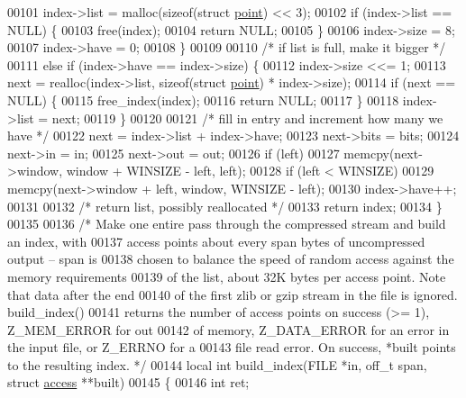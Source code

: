 \begin{DoxyCode}
00101         index->list = malloc(\textcolor{keyword}{sizeof}(\textcolor{keyword}{struct} \hyperlink{structpoint}{point}) << 3);
00102         \textcolor{keywordflow}{if} (index->list == NULL) \{
00103             free(index);
00104             \textcolor{keywordflow}{return} NULL;
00105         \}
00106         index->size = 8;
00107         index->have = 0;
00108     \}
00109 
00110     \textcolor{comment}{/* if list is full, make it bigger */}
00111     \textcolor{keywordflow}{else} \textcolor{keywordflow}{if} (index->have == index->size) \{
00112         index->size <<= 1;
00113         next = realloc(index->list, \textcolor{keyword}{sizeof}(\textcolor{keyword}{struct} \hyperlink{structpoint}{point}) * index->size);
00114         \textcolor{keywordflow}{if} (next == NULL) \{
00115             free\_index(index);
00116             \textcolor{keywordflow}{return} NULL;
00117         \}
00118         index->list = next;
00119     \}
00120 
00121     \textcolor{comment}{/* fill in entry and increment how many we have */}
00122     next = index->list + index->have;
00123     next->bits = bits;
00124     next->in = in;
00125     next->out = out;
00126     \textcolor{keywordflow}{if} (left)
00127         memcpy(next->window, window + WINSIZE - left, left);
00128     \textcolor{keywordflow}{if} (left < WINSIZE)
00129         memcpy(next->window + left, window, WINSIZE - left);
00130     index->have++;
00131 
00132     \textcolor{comment}{/* return list, possibly reallocated */}
00133     \textcolor{keywordflow}{return} index;
00134 \}
00135 
00136 \textcolor{comment}{/* Make one entire pass through the compressed stream and build an index, with}
00137 \textcolor{comment}{   access points about every span bytes of uncompressed output -- span is}
00138 \textcolor{comment}{   chosen to balance the speed of random access against the memory requirements}
00139 \textcolor{comment}{   of the list, about 32K bytes per access point.  Note that data after the end}
00140 \textcolor{comment}{   of the first zlib or gzip stream in the file is ignored.  build\_index()}
00141 \textcolor{comment}{   returns the number of access points on success (>= 1), Z\_MEM\_ERROR for out}
00142 \textcolor{comment}{   of memory, Z\_DATA\_ERROR for an error in the input file, or Z\_ERRNO for a}
00143 \textcolor{comment}{   file read error.  On success, *built points to the resulting index. */}
00144 local \textcolor{keywordtype}{int} build\_index(FILE *in, off\_t span, \textcolor{keyword}{struct} \hyperlink{structaccess}{access} **built)
00145 \{
00146     \textcolor{keywordtype}{int} ret;

\end{DoxyCode}
